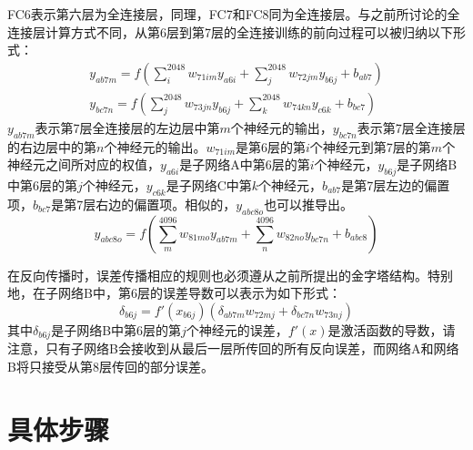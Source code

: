 FC6表示第六层为全连接层，同理，FC7和FC8同为全连接层。与之前所讨论的全连接层计算方式不同，从第6层到第7层的全连接训练的前向过程可以被归纳以下形式：
\begin{align}
y_{ab7m}=f(\sum_{i}^{2048} w_{71im}  y_{a6i} + \sum_{j}^{2048} w_{72jm}  y_{b6j} + b_{ab7}) \\
y_{bc7n}=f(\sum_{j}^{2048} w_{73jn}  y_{b6j} + \sum_{k}^{2048} w_{74kn}  y_{c6k} + b_{bc7}) 
\end{align}
$y_{ab7m}$表示第7层全连接层的左边层中第$m$个神经元的输出，$y_{bc7n}$表示第7层全连接层的右边层中的第$n$个神经元的输出。$w_{71im}$是第6层的第$i$个神经元到第7层的第$m$个神经元之间所对应的权值，$y_{a6i}$是子网络A中第6层的第$i$个神经元，$y_{b6j}$是子网络B中第6层的第$j$个神经元，$y_{c6k}$是子网络C中第$k$个神经元，$b_{ab7}$是第7层左边的偏置项，$b_{bc7}$是第7层右边的偏置项。相似的，$y_{abc8o}$也可以推导出。
\begin{equation}
y_{abc8o}=f(\sum_{m}^{4096} w_{81mo}  y_{ab7m} + \sum_{n}^{4096} w_{82no}  y_{bc7n} + b_{abc8})
\end{equation}

在反向传播时，误差传播相应的规则也必须遵从之前所提出的金字塔结构。特别地，在子网络B中，第6层的误差导数可以表示为如下形式：
\begin{equation}
\delta_{b6j}=f'(x_{b6j}) (\delta_{ab7m}  w_{72mj} + \delta_{bc7n}  w_{73nj})
\end{equation}
其中$\delta_{b6j}$是子网络B中第6层的第$j$个神经元的误差，$f'(x)$是激活函数的导数，请注意，只有子网络B会接收到从最后一层所传回的所有反向误差，而网络A和网络B将只接受从第8层传回的部分误差。

\section{具体步骤}

